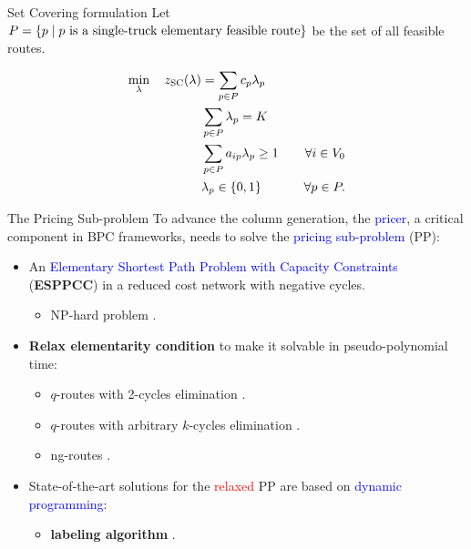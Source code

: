 \begin{frame}{Set Covering formulation}
	Let $P = \Set*{p \mid p\ \text{is a single-truck elementary feasible route}}$ be the set of all feasible routes.

	\begin{align}
		\min_{\lambda} \quad z_\mt{SC}(\lambda) & = \sum_{p \in P}  c_p \lambda_p              & \label{eq:set-covering-obj-func}                                                       \\
		                                        & \sum_{p \in P} \lambda_{p} = K               & \label{eq:set-covering-K-routes}                                                       \\
		                                        & \sum_{p \in P}  a_{ip} \lambda_p \ge 1       & \quad \forall i \in V_0 \label{eq:set-covering-customers-visited-by-exactly-one-route} \\
		                                        & \lambda_p                    \in \Set*{0, 1} & \quad \forall p \in P \label{eq:set-covering-lambda-mip-var-bounds}.
	\end{align}
\end{frame}

\begin{frame}{The Pricing Sub-problem}
	To advance the column generation, the \textcolor{blue}{pricer}, a critical component in BPC frameworks, needs to solve the \textcolor{blue}{pricing sub-problem} (PP):
	\begin{itemize}
		\item An \textcolor{blue}{Elementary Shortest Path Problem with Capacity Constraints} (\textbf{ESPPCC}) in a reduced cost network with negative cycles.
		      \begin{itemize}
			      \item NP-hard problem \parencite{dror1994}.
		      \end{itemize}
		\item \textbf{Relax elementarity condition} to make it solvable in pseudo-polynomial time:
		      \begin{itemize}
			      \item $q$-routes with 2-cycles elimination \parencite{christofides1969}.
			      \item $q$-routes with arbitrary $k$-cycles elimination \parencite{christofides1969}.
			      \item ng-routes \parencite{baldacci2011}.
		      \end{itemize}
		\item State-of-the-art solutions for the \textcolor{red}{relaxed} PP are based on \textcolor{blue}{dynamic programming}:
		      \begin{itemize}
			      \item \textbf{labeling algorithm} \parencite{desrochers1992, feillet2004}.
		      \end{itemize}
	\end{itemize}
\end{frame}
